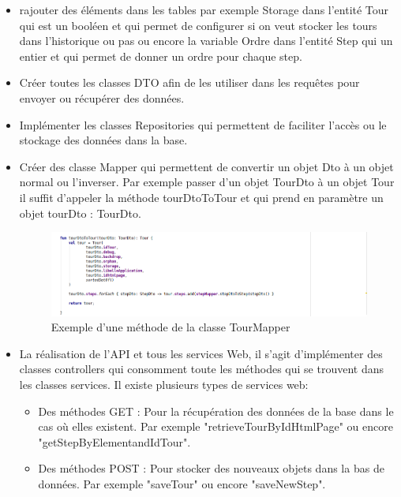 \documentclass[12pt]{article}
\begin{document}
\begin{itemize}

\item rajouter des éléments dans les tables par exemple Storage dans l'entité Tour qui est un booléen et qui permet de configurer si on veut stocker les tours dans l'historique ou pas ou encore la variable Ordre dans l'entité Step qui un entier et qui permet de donner un ordre pour chaque step.
\item Créer toutes les classes DTO afin de les utiliser dans les requêtes  pour envoyer ou récupérer des données.

\item Implémenter les classes Repositories qui permettent de faciliter l'accès  ou le stockage des données dans la base.

\item Créer des classe Mapper qui permettent de convertir un objet Dto à un objet normal ou l'inverser. Par exemple passer d'un objet TourDto à un objet Tour il suffit d'appeler la méthode tourDtoToTour et qui prend en paramètre un objet tourDto : TourDto.

 \begin{figure}[H]
	\centering
 		\includegraphics[width=1\textwidth]{diagrammes/Exemple_tourDtoToTour.png}
  		\caption{Exemple d'une méthode de la classe TourMapper}
	\end{figure}

\item La réalisation de l'API et tous les services Web, il s'agit d’implémenter des classes controllers qui consomment toute les méthodes qui se trouvent dans les classes services. Il existe plusieurs types de services web:
\begin{itemize}
\item Des méthodes GET : Pour la récupération des données de la base dans le cas où elles existent. Par exemple "retrieveTourByIdHtmlPage" ou encore "getStepByElementandIdTour".

\item Des méthodes POST : Pour stocker des nouveaux objets dans la bas de données. Par exemple "saveTour" ou encore "saveNewStep".


\end{itemize}
\end{itemize}
\end{document}
